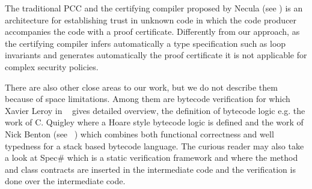 
 The traditional PCC and the certifying compiler proposed by Necula (see \cite{ComNec,DesNecLee98}) is an architecture for 
 establishing trust in unknown code in which the code producer accompanies the code with a proof certificate. Differently from our approach,
  as the certifying compiler infers automatically a type specification such as loop invariants and generates automatically the proof certificate
  it is not applicable for complex security policies.

There are also other close areas to our work, but we do not describe them because of space limitations.
Among them are bytecode verification for which Xavier Leroy in  ~\cite{Ljbc} gives detailed overview, 
the definition of bytecode logic e.g. the work of C. Quigley \cite{Quigley} where a Hoare style bytecode logic is defined and
the work of Nick Benton (see ~\cite{B04tlsj}) which combines both functional correctness and well typedness for a stack based bytecode language. 
The curious reader may also take a look at Spec\# \cite{BLS04sp} which is a static verification framework and
 where the method and class contracts are inserted in the intermediate code and the verification is done over the intermediate code. 



 
